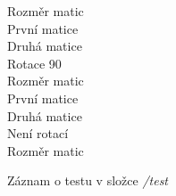 \documentclass{beamer}
\begin{document}
\begin{frame}
\begin{multicols}{4}
{    Rozměr matic\\
    První matice\\
    Druhá matice\\
    Rotace 90\\

    Rozměr matic\\
    První matice\\
    Druhá matice\\
    Není rotací\\

    Rozměr matic}

    \end{multicols}

    \small{Záznam o testu v složce \textit{/test}}
\end{frame}
\end{document}
